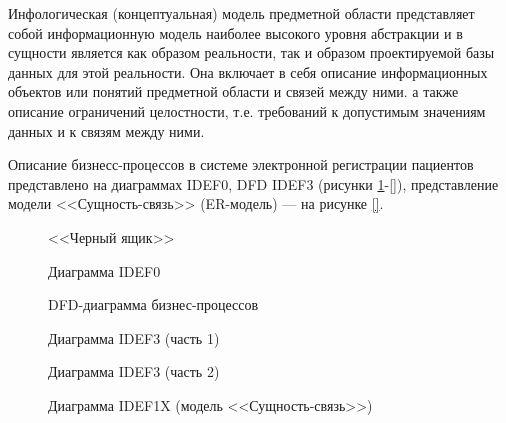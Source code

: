 Инфологическая (концептуальная) модель предметной области представляет собой информационную модель наиболее высокого уровня абстракции и в сущности является как образом реальности, так и образом проектируемой базы данных для этой реальности. Она включает в себя описание информационных объектов или понятий предметной области и связей между ними. а также описание ограничений целостности, т.е. требований к допустимым значениям данных и к связям между ними.

Описание бизнесс-процессов в системе электронной регистрации пациентов представлено на диаграммах IDEF0, DFD IDEF3 (рисунки \ref{idef0_1:idef0_1}-\ref{}), представление модели <<Сущность-связь>> (ER-модель) --- на рисунке \ref{}.

\begin{figure}[h!]
\caption{<<Черный ящик>>}
\label{idef0_1:idef0_1}
\end{figure} 

\begin{figure}[h!]
\caption{Диаграмма IDEF0}
\label{idef0_2:idef0_2}
\end{figure} 

\begin{figure}[h!]
\caption{DFD-диаграмма бизнес-процессов}
\label{dfd:dfd}
\end{figure} 

\begin{figure}[h!]
\caption{Диаграмма IDEF3 (часть 1)}
\label{idef3_1:idef3_1}
\end{figure} 

\begin{figure}[h!]
\caption{Диаграмма IDEF3 (часть 2)}
\label{idef3_2:idef3_2}
\end{figure} 

\begin{figure}[h!]
\caption{Диаграмма IDEF1X (модель <<Сущность-связь>>)}
\label{idef1x:idef1x}
\end{figure} 




